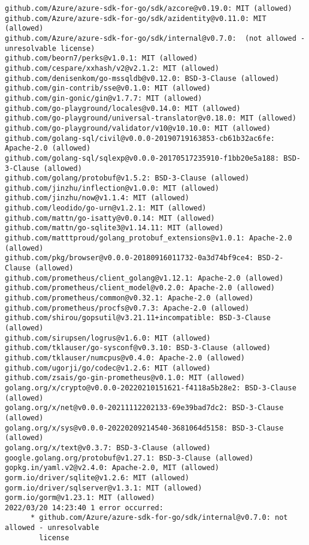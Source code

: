 \begin{verbatim}
github.com/Azure/azure-sdk-for-go/sdk/azcore@v0.19.0: MIT (allowed)
github.com/Azure/azure-sdk-for-go/sdk/azidentity@v0.11.0: MIT (allowed)
github.com/Azure/azure-sdk-for-go/sdk/internal@v0.7.0:  (not allowed - unresolvable license)
github.com/beorn7/perks@v1.0.1: MIT (allowed)
github.com/cespare/xxhash/v2@v2.1.2: MIT (allowed)
github.com/denisenkom/go-mssqldb@v0.12.0: BSD-3-Clause (allowed)
github.com/gin-contrib/sse@v0.1.0: MIT (allowed)
github.com/gin-gonic/gin@v1.7.7: MIT (allowed)
github.com/go-playground/locales@v0.14.0: MIT (allowed)
github.com/go-playground/universal-translator@v0.18.0: MIT (allowed)
github.com/go-playground/validator/v10@v10.10.0: MIT (allowed)
github.com/golang-sql/civil@v0.0.0-20190719163853-cb61b32ac6fe: Apache-2.0 (allowed)
github.com/golang-sql/sqlexp@v0.0.0-20170517235910-f1bb20e5a188: BSD-3-Clause (allowed)
github.com/golang/protobuf@v1.5.2: BSD-3-Clause (allowed)
github.com/jinzhu/inflection@v1.0.0: MIT (allowed)
github.com/jinzhu/now@v1.1.4: MIT (allowed)
github.com/leodido/go-urn@v1.2.1: MIT (allowed)
github.com/mattn/go-isatty@v0.0.14: MIT (allowed)
github.com/mattn/go-sqlite3@v1.14.11: MIT (allowed)
github.com/matttproud/golang_protobuf_extensions@v1.0.1: Apache-2.0 (allowed)
github.com/pkg/browser@v0.0.0-20180916011732-0a3d74bf9ce4: BSD-2-Clause (allowed)
github.com/prometheus/client_golang@v1.12.1: Apache-2.0 (allowed)
github.com/prometheus/client_model@v0.2.0: Apache-2.0 (allowed)
github.com/prometheus/common@v0.32.1: Apache-2.0 (allowed)
github.com/prometheus/procfs@v0.7.3: Apache-2.0 (allowed)
github.com/shirou/gopsutil@v3.21.11+incompatible: BSD-3-Clause (allowed)
github.com/sirupsen/logrus@v1.6.0: MIT (allowed)
github.com/tklauser/go-sysconf@v0.3.10: BSD-3-Clause (allowed)
github.com/tklauser/numcpus@v0.4.0: Apache-2.0 (allowed)
github.com/ugorji/go/codec@v1.2.6: MIT (allowed)
github.com/zsais/go-gin-prometheus@v0.1.0: MIT (allowed)
golang.org/x/crypto@v0.0.0-20220210151621-f4118a5b28e2: BSD-3-Clause (allowed)
golang.org/x/net@v0.0.0-20211112202133-69e39bad7dc2: BSD-3-Clause (allowed)
golang.org/x/sys@v0.0.0-20220209214540-3681064d5158: BSD-3-Clause (allowed)
golang.org/x/text@v0.3.7: BSD-3-Clause (allowed)
google.golang.org/protobuf@v1.27.1: BSD-3-Clause (allowed)
gopkg.in/yaml.v2@v2.4.0: Apache-2.0, MIT (allowed)
gorm.io/driver/sqlite@v1.2.6: MIT (allowed)
gorm.io/driver/sqlserver@v1.3.1: MIT (allowed)
gorm.io/gorm@v1.23.1: MIT (allowed)
2022/03/20 14:23:40 1 error occurred:
      * github.com/Azure/azure-sdk-for-go/sdk/internal@v0.7.0: not allowed - unresolvable
        license
\end{verbatim}
\egroup

